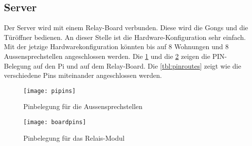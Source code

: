 \subsection{Server}
\label{sec:chapterexample}

Der Server wird mit einem Relay-Board verbunden. Diese wird die Gongs und die Türöffner bedienen. An dieser Stelle ist die Hardware-Konfiguration sehr einfach. Mit der jetzige Hardwarekonfiguration könnten bis auf 8 Wohnungen und 8 Aussensprechstellen angeschlossen werden. Die \cref{fig:pipins} und die \cref{fig:boardpins} zeigen die PIN-Belegung auf den Pi und auf dem Relay-Board. Die \cref{tbl:pinroutes} zeigt wie die verschiedene Pins miteinander angeschlossen werden.

\begin{figure}[htb!]
	\begin{center}
		\texttt{[image: pipins]}
		\caption[EthernetPinbelegung]{Pinbelegung für die Aussensprechstellen}
		\label{fig:pipins}
	\end{center}
\end{figure}

\begin{figure}[htb!]
	\begin{center}
		\texttt{[image: boardpins]}
		\caption[EthernetPinbelegung]{Pinbelegung für das Relais-Modul}
		\label{fig:boardpins}
	\end{center}
\end{figure}

